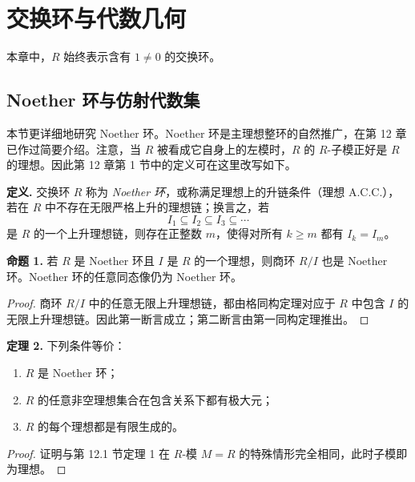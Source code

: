 





\chapter{交换环与代数几何}

本章中，$R$ 始终表示含有 $1\ne0$ 的交换环。

\section{Noether 环与仿射代数集}

本节更详细地研究 Noether 环。Noether 环是主理想整环的自然推广，在第 12 章已作过简要介绍。注意，当 $R$ 被看成它自身上的左模时，$R$ 的 $R$-子模正好是 $R$ 的理想。因此第 12 章第 1 节中的定义可在这里改写如下。

\noindent\textbf{定义.} 交换环 $R$ 称为 \emph{Noether 环}，或称满足理想上的升链条件（理想 A.C.C.），若在 $R$ 中不存在无限严格上升的理想链；换言之，若
\[
I_1\subseteq I_2\subseteq I_3\subseteq\cdots
\]
是 $R$ 的一个上升理想链，则存在正整数 $m$，使得对所有 $k\ge m$ 都有 $I_k=I_m$。

\noindent\textbf{命题 1.} 若 $R$ 是 Noether 环且 $I$ 是 $R$ 的一个理想，则商环 $R/I$ 也是 Noether 环。Noether 环的任意同态像仍为 Noether 环。

\begin{proof}
	商环 $R/I$ 中的任意无限上升理想链，都由格同构定理对应于 $R$ 中包含 $I$ 的无限上升理想链。因此第一断言成立；第二断言由第一同构定理推出。
\end{proof}

\noindent\textbf{定理 2.} 下列条件等价：
\begin{enumerate}[label=(\arabic*)]
	\item $R$ 是 Noether 环；
	\item $R$ 的任意非空理想集合在包含关系下都有极大元；
	\item $R$ 的每个理想都是有限生成的。
\end{enumerate}

\begin{proof}
	证明与第 12.1 节定理 1 在 $R$-模 $M=R$ 的特殊情形完全相同，此时子模即为理想。
\end{proof}

